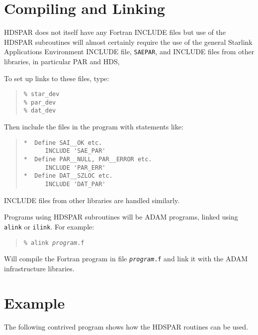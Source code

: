 \documentclass[twoside,11pt]{article}
\newcommand{\xref}[3]{#1}
\newcommand{\xlabel}[1]{}
\renewcommand{\_}{\texttt{\symbol{95}}}
\begin{document}
\section{\xlabel{compiling_and_linking}Compiling and Linking}
HDSPAR does not itself have any Fortran 
\xref{INCLUDE files}{sun144}{include_files}
but use of the HDSPAR subroutines will almost certainly require the use of 
the general Starlink Applications Environment INCLUDE file, \texttt{SAE\_PAR},
and INCLUDE files from other libraries, in particular
\xref{PAR}{sun114}{abort_and_null}
and
\xref{HDS}{sun92}{routines_and_constants},

To set up links to these files, type:
\begin{quote} \begin{verbatim}
% star_dev
% par_dev
% dat_dev
\end{verbatim} \end{quote}
Then include the files in the program with statements like:
\begin{quote} \begin{verbatim}
*  Define SAI__OK etc.
      INCLUDE 'SAE_PAR'
*  Define PAR__NULL, PAR__ERROR etc.
      INCLUDE 'PAR_ERR'
*  Define DAT__SZLOC etc.
      INCLUDE 'DAT_PAR'
\end{verbatim} \end{quote}
INCLUDE files from other libraries are handled similarly.

Programs using HDSPAR subroutines will be ADAM programs, linked using
\xref{\texttt{alink} or \texttt{ilink}}{sun144}{adam_link_scripts}.
For example:
\begin{quote}
\texttt{\% alink \textit{program}.f}
\end{quote}
Will compile the Fortran program in file \texttt{\textit{program}.f} and link 
it with the ADAM infrastructure libraries.

\section{\xlabel{example}Example\label{example}}
The following contrived program shows how the HDSPAR routines can be used.
\end{document}
